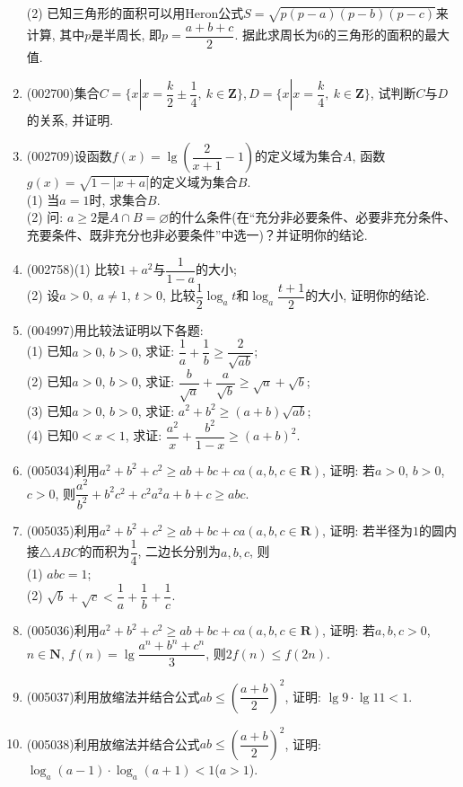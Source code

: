 \documentclass[10pt,a4paper]{article}
\begin{document}
\begin{enumerate}[1.]
(2) 已知三角形的面积可以用Heron公式$S=\sqrt{p(p-a)(p-b)(p-c)}$来计算, 其中$p$是半周长, 即$p=\dfrac{a+b+c}{2}$. 据此求周长为$6$的三角形的面积的最大值.
\item {\tiny (002700)}集合$C=\{x|x=\dfrac k2\pm \dfrac14, \ k\in \mathbf{Z}\},D=\{x|x=\dfrac k4,\ k\in \mathbf{Z}\}$, 试判断$C$与$D$的关系, 并证明.
\n\vspace*{24ex}
\item {\tiny (002709)}设函数$f(x)=\lg (\dfrac2{x+1}-1)$的定义域为集合$A$, 函数$g(x)=\sqrt{1-|x+a|}$的定义域为集合$B$.\\
(1) 当$a=1$时, 求集合$B$.\\
(2) 问: $a\ge 2$是$A\cap B=\varnothing$的什么条件(在``充分非必要条件、必要非充分条件、充要条件、既非充分也非必要条件''中选一)？并证明你的结论.
\item {\tiny (002758)}(1) 比较$1+a^2$与$\dfrac 1{1-a}$的大小;\\
(2) 设$a>0,\ a\ne 1$, $t>0$, 比较$\dfrac 12\log_at$和$\log_a\dfrac{t+1}2$的大小, 证明你的结论.
\item {\tiny (004997)}用比较法证明以下各题:\\
(1) 已知$a>0$, $b>0$, 求证: $\dfrac 1a+\dfrac 1b\ge \dfrac 2{\sqrt{ab}}$;\\
(2) 已知$a>0$, $b>0$, 求证: $\dfrac b{\sqrt a}+\dfrac a{\sqrt b}\ge \sqrt a+\sqrt b$;\\
(3) 已知$a>0$, $b>0$, 求证: ${a^2}+{b^2}\ge (a+b)\sqrt{ab}$;\\
(4) 已知$0<x<1$, 求证: $\dfrac{a^2}x+\dfrac{b^2}{1-x}\ge (a+b)^2$.
\item {\tiny (005034)}利用$a^2+b^2+c^2\ge ab+bc+ca(a,b,c\in \mathbf{R})$, 证明: 若$a>0$, $b>0$, $c>0$, 则$\dfrac{a^2}{b^2}+{b^2}{c^2}+{c^2}{a^2}{a+b+c}\ge abc$.
\item {\tiny (005035)}利用$a^2+b^2+c^2\ge ab+bc+ca(a,b,c\in \mathbf{R})$, 证明: 若半径为$1$的圆内接$\triangle ABC$的而积为$\dfrac 14$, 二边长分别为$a,b,c$, 则\\(1) $abc=1$;\\
(2) $\sqrt b+\sqrt c<\dfrac 1a+\dfrac 1b+\dfrac 1c$.
\item {\tiny (005036)}利用$a^2+b^2+c^2\ge ab+bc+ca(a,b,c\in \mathbf{R})$, 证明: 若$a,b,c>0$, $n\in \mathbf{N}$, $f(n)=\lg \dfrac{a^n+b^n+c^n}3$, 则$2f(n)\le f(2n)$.
\item {\tiny (005037)}利用放缩法并结合公式$ab\le (\dfrac{a+b}2)^2$, 证明: $\lg 9\cdot \lg 11<1$.
\item {\tiny (005038)}利用放缩法并结合公式$ab\le (\dfrac{a+b}2)^2$, 证明: $\log_a(a-1)\cdot \log_a(a+1)<1$($a>1$).

\end{enumerate}
\end{document}
